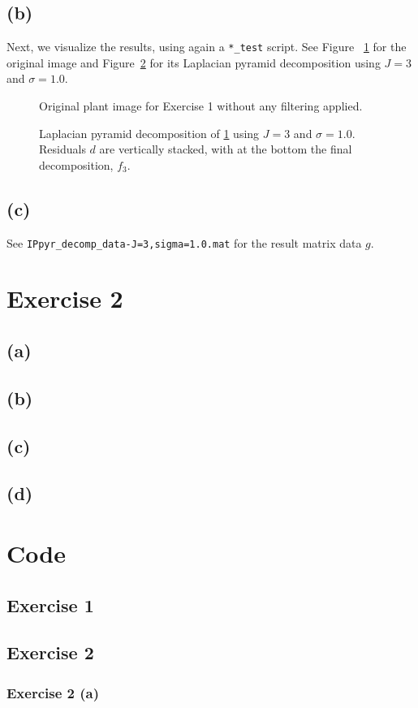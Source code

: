 \documentclass{article}
\begin{document}
\subsection*{(b)} Next, we visualize the results, using again a \texttt{*\_test} script. See Figure ~\ref{fig:plant_original} for the original image and Figure~\ref{fig:plant_all_pyr-decomp} for its Laplacian pyramid decomposition using $J=3$ and $\sigma=1.0$.

\begin{figure}[ht]
    \centering
    
    \caption{Original plant image for Exercise 1 without any filtering applied.}
    \label{fig:plant_original}
\end{figure}

\begin{figure}[ht]
    \centering
    
    \caption{Laplacian pyramid decomposition of \ref{fig:plant_original} using $J=3$ and $\sigma=1.0$. Residuals $d$ are vertically stacked, with at the bottom the final decomposition, $f_{3}$.}
    \label{fig:plant_all_pyr-decomp}
\end{figure}

\subsection*{(c)} See \texttt{IPpyr\_decomp\_data-J=3,sigma=1.0.mat} for the result matrix data $g$.

\section*{Exercise 2}
\subsection*{(a)}
\subsection*{(b)}
\subsection*{(c)}
\subsection*{(d)}

\newpage

\typeout{}


\appendix
\section{Code}
\subsection{Exercise 1}

\subsection{Exercise 2}
\subsubsection{Exercise 2 (a)}
\end{document}
